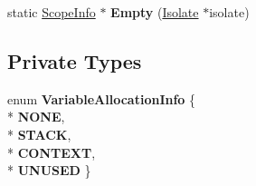 \begin{DoxyCompactItemize}
\item 
static \hyperlink{classv8_1_1internal_1_1_scope_info}{Scope\+Info} $\ast$ {\bfseries Empty} (\hyperlink{classv8_1_1internal_1_1_isolate}{Isolate} $\ast$isolate)\hypertarget{classv8_1_1internal_1_1_scope_info_af725329f91ea78bed4ed726c8ec49784}{}\label{classv8_1_1internal_1_1_scope_info_af725329f91ea78bed4ed726c8ec49784}

\end{DoxyCompactItemize}
\subsection*{Private Types}
\begin{DoxyCompactItemize}
\item 
enum {\bfseries Variable\+Allocation\+Info} \{ \\*
{\bfseries N\+O\+NE}, 
\\*
{\bfseries S\+T\+A\+CK}, 
\\*
{\bfseries C\+O\+N\+T\+E\+XT}, 
\\*
{\bfseries U\+N\+U\+S\+ED}
 \}\hypertarget{classv8_1_1internal_1_1_scope_info_a177e7d7ff7a408ee6308776543b035fb}{}\label{classv8_1_1internal_1_1_scope_info_a177e7d7ff7a408ee6308776543b035fb}

\end{DoxyCompactItemize}

